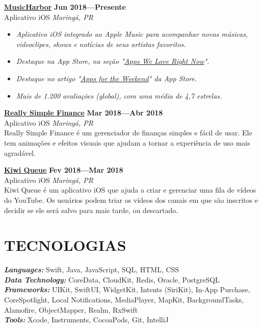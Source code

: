 \documentclass[line,margin]{res}
\begin{document}
\begin{resume}
  {\bf \href{https://apps.apple.com/us/app/musicharbor/id1440405750}{MusicHarbor}} \hfill {\bf Jun 2018---Presente} \\
  Aplicativo iOS \hfill {\sl Maring\'a, PR}\\[-6pt]
    \begin{itemize}
    \item {\sl Aplicativo iOS integrado ao Apple Music para acompanhar novas músicas, videoclipes, shows e notícias de seus artistas favoritos.}
    \item {\sl Destaque na App Store, na seção "\href{https://github.com/marcosatanaka/resume-latex/blob/master/images/apps_we_love_right_now.png?raw=true}{Apps We Love Right Now}".}
    \item {\sl Destaque no artigo "\href{https://apps.apple.com/us/story/id1516537723}{Apps for the Weekend}" da App Store.}
    \item {\sl Mais de 1.200 avaliações (global), com uma média de 4,7 estrelas.}
    \end{itemize}

  {\bf \href{https://itunes.apple.com/us/app/really-simple-finance/id1370859710}{Really Simple Finance}} \hfill {\bf Mar 2018---Abr 2018} \\
  Aplicativo iOS \hfill {\sl Maring\'a, PR}\\[6pt]
  Really Simple Finance é um gerenciador de finanças simples e fácil de usar. Ele tem animações e efeitos visuais que ajudam a tornar a experiência de uso mais agradável.

  {\bf \href{https://itunes.apple.com/us/app/kiwi-queue/id1352747116}{Kiwi Queue}} \hfill {\bf Fev 2018---Mar 2018} \\
  Aplicativo iOS \hfill {\sl Maring\'a, PR}\\[6pt]
  Kiwi Queue é um aplicativo iOS que ajuda a criar e gerenciar uma fila de vídeos do YouTube. Os usuários podem triar os vídeos dos canais em que são inscritos e decidir se ele será salvo para mais tarde, ou descartado.


\section{TECNOLOGIAS}
  {\sl {\bf Languages:}} Swift, Java, JavaScript, SQL, HTML, CSS \\
  {\sl {\bf Data Technology:}} CoreData, CloudKit, Redis, Oracle, PostgreSQL \\
  {\sl {\bf Frameworks:}} UIKit, SwiftUI, WidgetKit, Intents (SiriKit), In-App Purchase, CoreSpotlight, Local Notifications, MediaPlayer, MapKit, BackgroundTasks, Alamofire, ObjectMapper, Realm, RxSwift \\
  {\sl {\bf Tools:}} Xcode, Instruments, CocoaPods, Git, IntelliJ



\end{resume}
\end{document}
